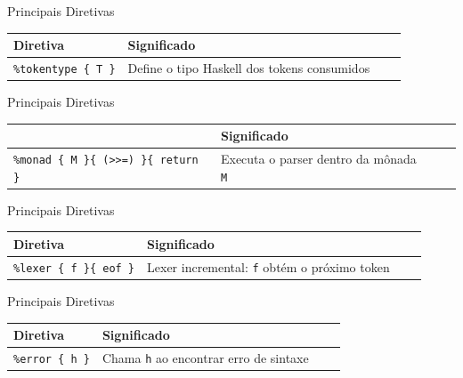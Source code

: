 \begin{frame}[fragile]{Principais Diretivas}

    \begin{table}
        \begin{tabular}{l l l l}
            \hline
            Diretiva & Significado \\
            \hline
            \texttt{\%tokentype \{ T \}} & Define o tipo Haskell
            dos tokens consumidos \\
            \hline
        \end{tabular}
    \end{table}
\end{frame}

\begin{frame}[fragile]{Principais Diretivas}

    \begin{table}
        \begin{tabular}{l l l l}
            }
            }@{}}
            \hline
            Diretiva & Significado \\
        \hline
        \texttt{\%monad \{ M \}\{ (>>=) \}\{ return \}} &
        Executa o parser dentro da mônada \texttt{M} \\
        \hline
    \end{tabular}
\end{table}
\end{frame}

\begin{frame}[fragile]{Principais Diretivas}

    \begin{table}
        \begin{tabular}{l l l l}
            \hline
            Diretiva & Significado \\
            \hline
            \texttt{\%lexer \{ f \}\{ eof \}} & Lexer incremental:
            \texttt{f} obtém o próximo token \\
            \hline
        \end{tabular}
    \end{table}
\end{frame}

\begin{frame}[fragile]{Principais Diretivas}

    \begin{table}
        \begin{tabular}{l l l l}
            \hline
            Diretiva & Significado \\
            \hline
            \texttt{\%error \{ h \}} & Chama
            \texttt{h} ao encontrar erro de sintaxe \\
            \hline
        \end{tabular}
    \end{table}
\end{frame}

